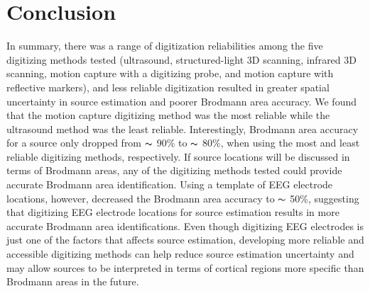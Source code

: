 \documentclass[../thesis_seyed.tex]{subfiles}
\begin{document}
\section{Conclusion}

In summary, there was a range of digitization reliabilities among the five digitizing methods tested (ultrasound, structured-light 3D scanning, infrared 3D scanning, motion capture with a digitizing probe, and motion capture with reflective markers), and less reliable digitization resulted in greater spatial uncertainty in source estimation and poorer Brodmann area accuracy. We found that the motion capture digitizing method was the most reliable while the ultrasound method was the least reliable. Interestingly, Brodmann area accuracy for a source only dropped from $\thicksim$ 90\% to $\thicksim$ 80\%, when using the most and least reliable digitizing methods, respectively. If source locations will be discussed in terms of Brodmann areas, any of the digitizing methods tested could provide accurate Brodmann area identification. Using a template of EEG electrode locations, however, decreased the Brodmann area accuracy to $\thicksim$ 50\%, suggesting that digitizing EEG electrode locations for source estimation results in more accurate Brodmann area identifications. Even though digitizing EEG electrodes is just one of the factors that affects source estimation, developing more reliable and accessible digitizing methods can help reduce source estimation uncertainty and may allow sources to be interpreted in terms of cortical regions more specific than Brodmann areas in the future. 





\end{document}
